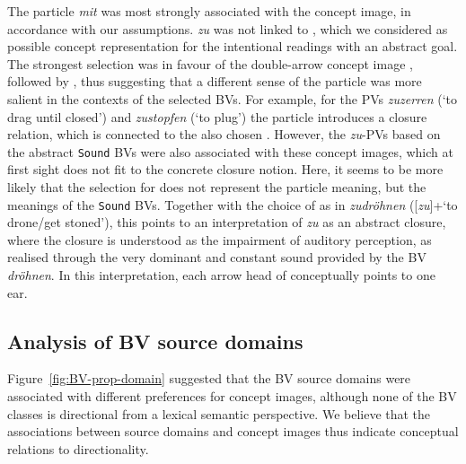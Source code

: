 \documentclass[output=paper]{langsci/langscibook}
\begin{document}
The particle \textit{mit} was most strongly associated with the
 concept image, in accordance with our assumptions. \textit{zu}
was not linked to , which we considered as
possible concept representation for the intentional readings with an
abstract goal. The strongest selection was in favour of the
double-arrow concept image , followed by , thus
suggesting that a different sense of the particle was more salient in
the contexts of the selected BVs. For example, for the PVs
\textit{zuzerren} (`to drag until closed') and \textit{zustopfen} (`to
plug') the particle introduces a closure relation, which is connected
to the also chosen . However, the \textit{zu}-PVs
based on the abstract \texttt{Sound} BVs were also associated with
these concept images, which at first sight does not fit to the concrete closure
notion. Here, it seems to be more likely that the selection for
 does not represent the particle meaning, but the
meanings of the \texttt{Sound} BVs. Together with the choice of
 as in \textit{zudröhnen} ([\textit{zu}]+`to drone/get
stoned'), this points to an interpretation of \textit{zu} as an
abstract closure, where the closure is understood as the impairment of
auditory perception, as realised through the very dominant and
constant sound provided by the BV \textit{dröhnen}. In this
interpretation, each arrow head of  conceptually
points to one ear.

\subsection{Analysis of BV source domains}
\label{sec:disc-domain}

Figure~\ref{fig:BV-prop-domain} suggested that the BV source domains
were associated with different preferences for concept images,
although none of the BV classes is directional from a lexical semantic
perspective. We believe that the associations between source domains
and concept images thus indicate conceptual relations to
directionality.
\end{document}
